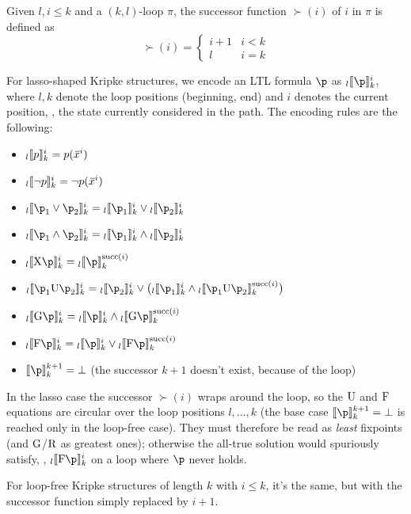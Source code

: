 \documentclass[oneside]{academica}
\begin{document}
\begin{definition*}
  Given $l, i \leq k$ and a $(k,l)$-loop $\pi$, the successor function $\succ(i)$ of $i$ in $\pi$ is defined as
  \begin{equation*}
    \succ(i) =
    \begin{cases}
      i + 1 & i < k \\
      l & i = k
    \end{cases}
  \end{equation*}
\end{definition*}

For lasso-shaped Kripke structures, we encode an LTL formula $\p$ as $\kloopil{\p}$, where $l,k$ denote the loop positions (beginning, end) and $i$ denotes the current position, \ie, the state currently considered in the path.
The encoding rules are the following:
\begin{itemize}
  \item ${}_l \llbracket {p} \rrbracket^i_k = p(\,\overline{\!{x}}^i)$
  \item ${}_l \llbracket {\neg p} \rrbracket^i_k = \neg p(\,\overline{\!{x}}^i)$
  \item $\kloopil{\p_1 \lor \p_2} = \kloopil{\p_1} \lor \kloopil{\p_2}$
  \item $\kloopil{\p_1 \land \p_2} = \kloopil{\p_1} \land \kloopil{\p_2}$
  \item $\kloopil{\XX \p} = \kloopsl{\p}$
  \item $\kloopil{\p_1 \UU \p_2} = \kloopil{\p_2} \lor \big(\kloopil{\p_1} \land \kloopsl{\p_1 \UU \p_2}\big)$
  \item $\kloopil{\GG \p} = \kloopil{\p} \land \kloopsl{\GG \p}$
  \item $\kloopil{\FF \p} = \kloopil{\p} \lor \kloopsl{\FF \p}$
  \item $\kloop{\p}^{k+1} = \bot$ (the successor $k+1$ doesn't exist, because of the loop)
\end{itemize}

\begin{note}
  In the lasso case the successor $\succ(i)$ wraps around the loop, so the $\mathrm{U}$ and $\mathrm{F}$ equations are circular over the loop positions $l,\dots,k$ (the base case $\kloop{\p}^{k+1}=\bot$ is reached only in the loop-free case). They must therefore be read as \emph{least} fixpoints (and $\mathrm{G}$/$\mathrm{R}$ as greatest ones); otherwise the all-true solution would spuriously satisfy, \eg, $\kloopil{\FF\p}$ on a loop where $\p$ never holds.
\end{note}

For loop-free Kripke structures of length $k$ with $i \leq k$, it's the same, but with the successor function simply replaced by $i+1$.
\end{document}

